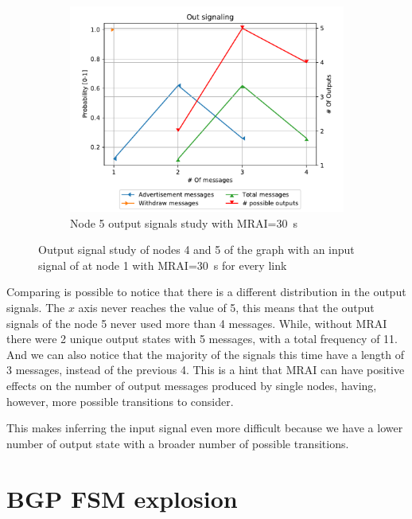 \begin{figure}[h]
\begin{subfigure}[b]{0.45\textwidth}
         \includegraphics[width=\textwidth]{images/signal_study/fig_4_MRAI/fig_4_5_signaling_nmessage_prob.pdf}
		 \caption{Node \num{5} output signals study with \ac{MRAI}=\SI{30}{\second}}
         \label{fig:signal_node5_MRAI}
     \end{subfigure}
		\caption{Output signal study of nodes \num{4} and \num{5} of the graph
			 with an input signal of  at node \num{1}
			with \ac{MRAI}=\SI{30}{\second} for every link}
        \label{fig:signal_griffin_fig4_MRAI}
\end{figure}

Comparing  is possible to notice
that there is a different distribution in the output signals.
The $x$ axis never reaches the value of \num{5}, this means that the output signals
of the node \num{5} never used more than \num{4} messages.
While, without \ac{MRAI} there were \num{2} unique output states with \num{5}
messages, with a total frequency of \num{11}.
And we can also notice that the majority of the signals this time have a length
of \num{3} messages, instead of the previous \num{4}.
This is a hint that \ac{MRAI} can have positive effects on the number of output messages
produced by single nodes, having, however, more possible transitions to consider.

This makes inferring the input signal even more difficult because we have a lower
number of output state with a broader number of possible transitions.

\section{BGP FSM explosion}
\label{sec:bgp_fsm_explosion}

